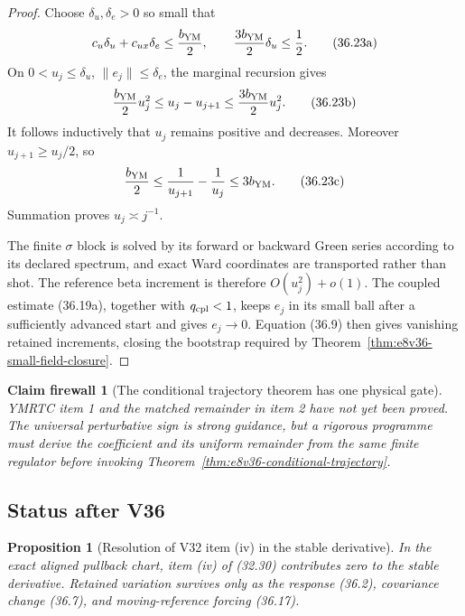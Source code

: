 \documentclass[11pt,oneside]{book}
\newtheorem{proposition}[theorem]{Proposition}
\newtheorem{firewall}[theorem]{Claim firewall}
\theoremstyle{definition}
\theoremstyle{remark}
\begin{document}
\begin{proof}
Choose \(\delta_u,\delta_e>0\) so small that
\[
 c_u\delta_u+c_{ux}\delta_e\leq\frac{b_{\rm YM}}2,
 \qquad
 \frac{3b_{\rm YM}}2\delta_u\leq\frac12.                         \tag{36.23a}
\]
On \(0<u_j\leq\delta_u\), \(\|e_j\|\leq\delta_e\), the marginal
recursion gives
\[
 \frac{b_{\rm YM}}2u_j^2
 \leq u_j-u_{j+1}
 \leq\frac{3b_{\rm YM}}2u_j^2.                                  \tag{36.23b}
\]
It follows inductively that \(u_j\) remains positive and decreases.
Moreover \(u_{j+1}\geq u_j/2\), so
\[
 \frac{b_{\rm YM}}2
 \leq
 \frac1{u_{j+1}}-\frac1{u_j}
 \leq3b_{\rm YM}.                                                \tag{36.23c}
\]
Summation proves \(u_j\asymp j^{-1}\).

The finite \(\sigma\) block is solved by its forward or backward
Green series according to its declared spectrum, and exact Ward
coordinates are transported rather than shot.  The reference beta
increment is therefore \(O(u_j^2)+o(1)\).  The coupled estimate
(36.19a), together with \(q_{\rm cpl}<1\), keeps \(e_j\) in its
small ball after a sufficiently advanced start and gives \(e_j\to0\).
Equation (36.9) then gives vanishing retained increments, closing the
bootstrap required by
Theorem~\ref{thm:e8v36-small-field-closure}.
\end{proof}

\begin{firewall}[The conditional trajectory theorem has one physical
gate]
\label{fire:e8v36-retained-gate}
YMRTC item 1 and the matched remainder in item 2 have not yet been
proved.  The universal perturbative sign is strong guidance, but a
rigorous programme must derive the coefficient and its uniform
remainder from the same finite regulator before invoking
Theorem~\ref{thm:e8v36-conditional-trajectory}.
\end{firewall}

\subsection{Status after V36}

\begin{proposition}[Resolution of V32 item (iv) in the stable
derivative]
\label{prop:e8v36-item-iv}
In the exact aligned pullback chart, item (iv) of (32.30) contributes
zero to the stable derivative.  Retained variation survives only as
the response (36.2), covariance change (36.7), and moving-reference
forcing (36.17).
\end{proposition}
\end{document}
